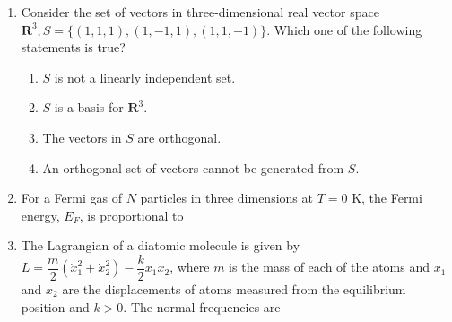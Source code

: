 \documentclass[14pt, a4paper]{extarticle}
\begin{document}
\begin{enumerate}[label=\textbf{Q. \arabic*}, start=21]
\item Consider the set of vectors in three-dimensional real vector space $\mathbf{R}^3, S = \{(1,1,1), (1,-1,1), (1,1,-1)\}$. Which one of the following statements is true?
\begin{enumerate}[label=(\Alph*)]
\item $S$ is not a linearly independent set.
\item $S$ is a basis for $\mathbf{R}^3$.
\item The vectors in $S$ are orthogonal.
\item An orthogonal set of vectors cannot be generated from $S$.
\end{enumerate}

\item For a Fermi gas of $N$ particles in three dimensions at $T=0$ K, the Fermi energy, $E_F$, is proportional to
\begin{enumerate}[label=(\Alph*)]
\end{enumerate}

\item The Lagrangian of a diatomic molecule is given by $L = \dfrac{m}{2}(\dot{x}_1^2 + \dot{x}_2^2) - \dfrac{k}{2}x_1 x_2$, where $m$ is the mass of each of the atoms and $x_1$ and $x_2$ are the displacements of atoms measured from the equilibrium position and $k > 0$. The normal frequencies are
\begin{enumerate}[label=(\Alph*)]
\end{enumerate}


\end{enumerate}
\end{document}
